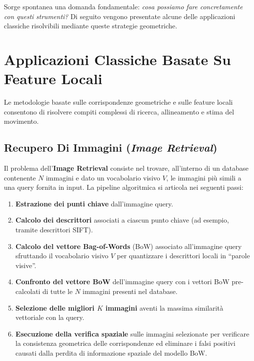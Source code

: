 ﻿\documentclass[11pt, a4paper]{article}
\begin{document}
Sorge spontanea una domanda fondamentale: \emph{cosa possiamo fare concretamente con questi strumenti?} Di seguito vengono presentate alcune delle applicazioni classiche risolvibili mediante queste strategie geometriche.

\newpage

\section{Applicazioni Classiche Basate Su Feature Locali}

Le metodologie basate sulle corrispondenze geometriche e sulle feature locali consentono di risolvere compiti complessi di ricerca, allineamento e stima del movimento.

\subsection{Recupero Di Immagini (\emph{Image Retrieval})}

Il problema dell'\textbf{Image Retrieval} consiste nel trovare, all'interno di un database contenente $N$ immagini e dato un vocabolario visivo $V$, le immagini più simili a una query fornita in input. La pipeline algoritmica si articola nei seguenti passi:

\begin{enumerate}
    \item \textbf{Estrazione dei punti chiave} dall'immagine query.
    \item \textbf{Calcolo dei descrittori} associati a ciascun punto chiave (ad esempio, tramite descrittori SIFT).
    \item \textbf{Calcolo del vettore Bag-of-Words} (BoW) associato all'immagine query sfruttando il vocabolario visivo $V$ per quantizzare i descrittori locali in ``parole visive''.
    \item \textbf{Confronto del vettore BoW} dell'immagine query con i vettori BoW pre-calcolati di tutte le $N$ immagini presenti nel database.
    \item \textbf{Selezione delle migliori $K$ immagini} aventi la massima similarità vettoriale con la query.
    \item \textbf{Esecuzione della verifica spaziale} sulle immagini selezionate per verificare la consistenza geometrica delle corrispondenze ed eliminare i falsi positivi causati dalla perdita di informazione spaziale del modello BoW.
\end{enumerate}

\end{document}

